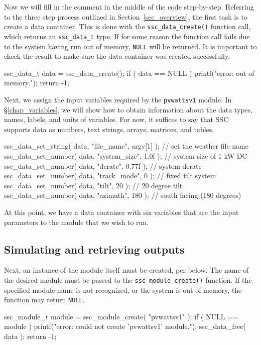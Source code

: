 \documentclass{article}
\begin{document}
Now we will fill in the comment in the middle of the code step-by-step.  Referring to the three step process outlined in Section~\ref{sec_overview}, the first task is to create a data container.  This is done with the \texttt{ssc\_data\_create()} function call, which returns an \texttt{ssc\_data\_t} type.  If for some reason the function call fails due to the system having run out of memory, \texttt{NULL} will be returned.  It is important to check the result to make sure the data container was created successfully.

\begin{verbatimtab}[4]
	ssc_data_t data = ssc_data_create();
	if ( data == NULL )
	{
		printf("error: out of memory.\n");
		return -1;
	}
\end{verbatimtab}

Next, we assign the input variables required by the \texttt{pvwattsv1} module.  In \S\ref{chap_variables}, we will show how to obtain information about the data types, names, labels, and units of variables.  For now, it suffices to say that SSC supports data as numbers, text strings, arrays, matrices, and tables.

\begin{verbatimtab}[4]
	ssc_data_set_string( data, "file_name", argv[1] ); // set the weather file name
	ssc_data_set_number( data, "system_size", 1.0f );  // system size of 1 kW DC
	ssc_data_set_number( data, "derate", 0.77f );      // system derate
	ssc_data_set_number( data, "track_mode", 0 );      // fixed tilt system
	ssc_data_set_number( data, "tilt", 20 );           // 20 degree tilt
	ssc_data_set_number( data, "azimuth", 180 );       // south facing (180 degrees)
\end{verbatimtab}

At this point, we have a data container with six variables that are the input parameters to the module that we wish to run.  

\subsection{Simulating and retrieving outputs}
\label{sec_ex_pvwatts_module}

Next, an instance of the module itself must be created, per below.  The name of the desired module must be passed to the \texttt{ssc\_module\_create()} function.  If the specified module name is not recognized, or the system is out of memory, the function may return \texttt{NULL}.

\begin{verbatimtab}[4]
	ssc_module_t module = ssc_module_create( "pvwattsv1" );
	if ( NULL == module )
	{
		printf("error: could not create 'pvwattsv1' module.\n");
		ssc_data_free( data );
		return -1;
	}
\end{verbatimtab}
\end{document}
